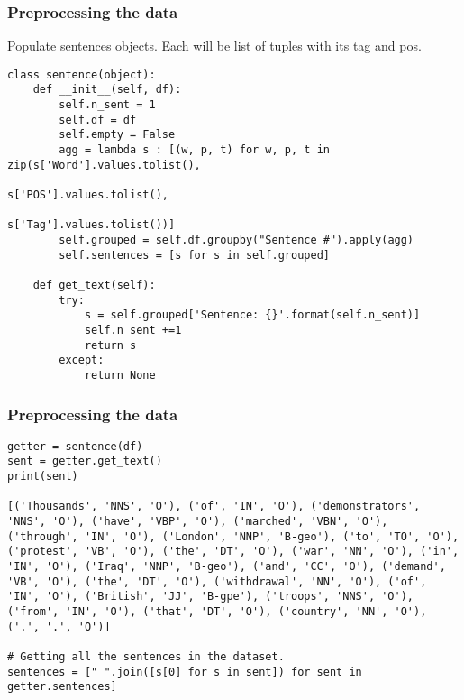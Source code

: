 \begin{frame}[fragile]\frametitle{Preprocessing the data}

Populate sentences objects. Each will be list of tuples with its tag and pos.

\begin{lstlisting}
class sentence(object):
    def __init__(self, df):
        self.n_sent = 1
        self.df = df
        self.empty = False
        agg = lambda s : [(w, p, t) for w, p, t in zip(s['Word'].values.tolist(),
                                                       s['POS'].values.tolist(),
                                                       s['Tag'].values.tolist())]
        self.grouped = self.df.groupby("Sentence #").apply(agg)
        self.sentences = [s for s in self.grouped]
        
    def get_text(self):
        try:
            s = self.grouped['Sentence: {}'.format(self.n_sent)]
            self.n_sent +=1
            return s
        except:
            return None
\end{lstlisting}
\end{frame}

\begin{frame}[fragile]\frametitle{Preprocessing the data}


\begin{lstlisting}
getter = sentence(df)
sent = getter.get_text()
print(sent)

[('Thousands', 'NNS', 'O'), ('of', 'IN', 'O'), ('demonstrators', 'NNS', 'O'), ('have', 'VBP', 'O'), ('marched', 'VBN', 'O'), ('through', 'IN', 'O'), ('London', 'NNP', 'B-geo'), ('to', 'TO', 'O'), ('protest', 'VB', 'O'), ('the', 'DT', 'O'), ('war', 'NN', 'O'), ('in', 'IN', 'O'), ('Iraq', 'NNP', 'B-geo'), ('and', 'CC', 'O'), ('demand', 'VB', 'O'), ('the', 'DT', 'O'), ('withdrawal', 'NN', 'O'), ('of', 'IN', 'O'), ('British', 'JJ', 'B-gpe'), ('troops', 'NNS', 'O'), ('from', 'IN', 'O'), ('that', 'DT', 'O'), ('country', 'NN', 'O'), ('.', '.', 'O')]

# Getting all the sentences in the dataset.
sentences = [" ".join([s[0] for s in sent]) for sent in getter.sentences]

\end{lstlisting}
\end{frame}

